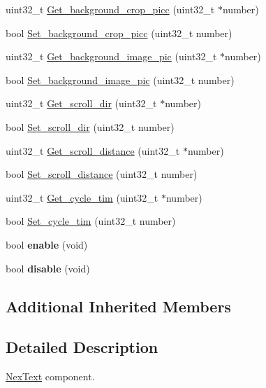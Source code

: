 \begin{DoxyCompactItemize}
uint32\+\_\+t \hyperlink{class_nex_scrolltext_a0d8e8997419f4d6460cc1e64f20cfb8c}{Get\+\_\+background\+\_\+crop\+\_\+picc} (uint32\+\_\+t $\ast$number)
\item 
bool \hyperlink{class_nex_scrolltext_a0a4d02fef0a0a1f9a1e41c66709b97c1}{Set\+\_\+background\+\_\+crop\+\_\+picc} (uint32\+\_\+t number)
\item 
uint32\+\_\+t \hyperlink{class_nex_scrolltext_a86ffab21e76beed5d801c05b94da6150}{Get\+\_\+background\+\_\+image\+\_\+pic} (uint32\+\_\+t $\ast$number)
\item 
bool \hyperlink{class_nex_scrolltext_a629fa1d39761144ec1e421c3c79a51aa}{Set\+\_\+background\+\_\+image\+\_\+pic} (uint32\+\_\+t number)
\item 
uint32\+\_\+t \hyperlink{class_nex_scrolltext_a4a437ad158a3be51e61dd469b77ee450}{Get\+\_\+scroll\+\_\+dir} (uint32\+\_\+t $\ast$number)
\item 
bool \hyperlink{class_nex_scrolltext_ad9ab4f129779d40fe5d108cac8c3a842}{Set\+\_\+scroll\+\_\+dir} (uint32\+\_\+t number)
\item 
uint32\+\_\+t \hyperlink{class_nex_scrolltext_a46ac65d7561b32fd4c5ac2f0aacf9bf1}{Get\+\_\+scroll\+\_\+distance} (uint32\+\_\+t $\ast$number)
\item 
bool \hyperlink{class_nex_scrolltext_a039a5f4dae5046142c4605097593545c}{Set\+\_\+scroll\+\_\+distance} (uint32\+\_\+t number)
\item 
uint32\+\_\+t \hyperlink{class_nex_scrolltext_a5d881dcad2360b42327cf95f8e91955f}{Get\+\_\+cycle\+\_\+tim} (uint32\+\_\+t $\ast$number)
\item 
bool \hyperlink{class_nex_scrolltext_ad639bf79aa963966241db4f45c7c8bd6}{Set\+\_\+cycle\+\_\+tim} (uint32\+\_\+t number)
\item 
\hypertarget{class_nex_scrolltext_a6941c1a200d0e4f913c5b37a7114b33a}{bool {\bfseries enable} (void)}\label{class_nex_scrolltext_a6941c1a200d0e4f913c5b37a7114b33a}

\item 
\hypertarget{class_nex_scrolltext_a909b5ec3d9b01a29715bf616dfafaeee}{bool {\bfseries disable} (void)}\label{class_nex_scrolltext_a909b5ec3d9b01a29715bf616dfafaeee}

\end{DoxyCompactItemize}
\subsection*{Additional Inherited Members}


\subsection{Detailed Description}
\hyperlink{class_nex_text}{Nex\+Text} component. 

